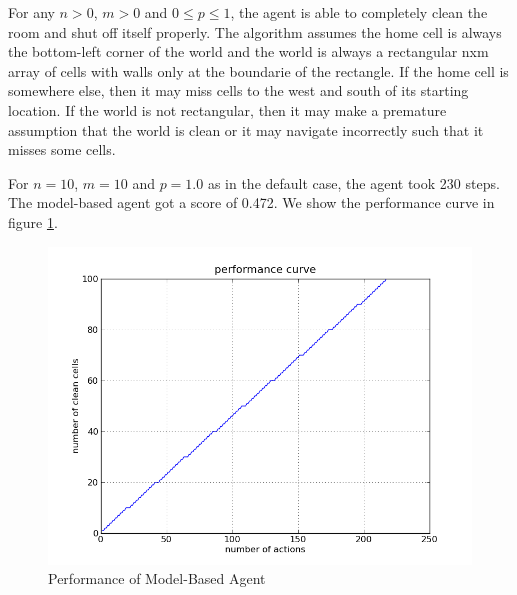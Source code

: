 For any $n>0$, $m>0$ and $0\le p \le1$, the agent is able to completely clean the room and shut off itself properly. The algorithm assumes the home cell is always the bottom-left corner of the world and the world is always a rectangular nxm array of cells with walls only at the boundarie of the rectangle. If the home cell is somewhere else, then it may miss cells to the west and south of its starting location. If the world is not rectangular, then it may make a premature assumption that the world is clean or it may navigate incorrectly such that it misses some cells.

For $n=10$, $m=10$ and $p=1.0$ as in the default case, the agent took 230 steps. The model-based agent got a score of 0.472. We show the performance curve in figure \ref{fig:agent3}.

\begin{figure}[!h]
\centering
\includegraphics[scale=.35]{img/agent3.png}
\caption{Performance of Model-Based Agent}
\label{fig:agent3}
\end{figure}
